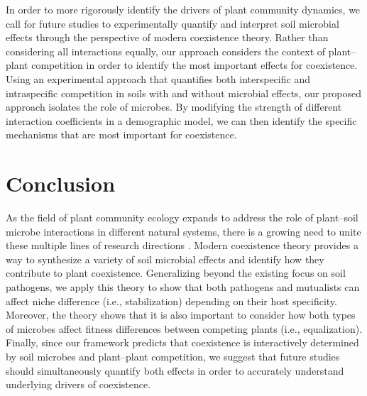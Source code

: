 In order to more rigorously identify the drivers of plant community dynamics, we call for future studies to experimentally quantify and interpret soil microbial effects through the perspective of modern coexistence theory.
Rather than considering all interactions equally, our approach considers the context of plant--plant competition in order to identify the most important effects for coexistence.
Using an experimental approach that quantifies both interspecific and intraspecific competition in soils with and without microbial effects, our proposed approach isolates the role of microbes. By modifying the strength of different interaction coefficients in a demographic model, we can then identify the specific mechanisms that are most important for coexistence.
\par



\section{Conclusion}
As the field of plant community ecology expands to address the role of plant--soil microbe interactions in different natural systems, there is a growing need to unite these multiple lines of research directions \citep{Mordecai2011, Peay2016}.
Modern coexistence theory provides a way to synthesize a variety of soil microbial effects and identify how they contribute to plant coexistence.
Generalizing beyond the existing focus on soil pathogens, we apply this theory to show that both pathogens and mutualists can affect niche difference (i.e., stabilization) depending on their host specificity.
Moreover, the theory shows that it is also important to consider how both types of microbes affect fitness differences between competing plants (i.e., equalization).
Finally, since our framework predicts that coexistence is interactively determined by soil microbes and plant--plant competition, we suggest that future studies should simultaneously quantify both effects in order to accurately understand underlying drivers of coexistence.
\par


